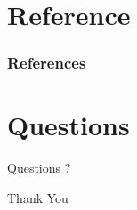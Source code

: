 \documentclass{beamer}
\begin{document}
\section{Reference}
\begin{frame}[allowframebreaks]
\frametitle{References}

%
\scriptsize{}
\nocite{*}
\end{frame}

\section{Questions}
\begin{frame}
\Huge{\centerline{Questions ?}}
\end{frame}
\begin{frame}
\Huge{\centerline{Thank You}}
\end{frame}

\end{document}
